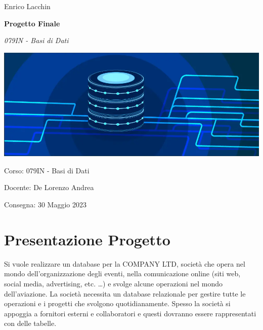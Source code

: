 \documentclass[12pt,a4paper]{article}
\begin{document}

\small{Enrico Lacchin}

\MidSep
\textbf{\LARGE{Progetto Finale}}

\MidSep
\textit{\Large{079IN - Basi di Dati}}
\Sep

\begin{center}
\includegraphics[width=1\columnwidth]{../../img/db}
\end{center}

\vfill
Corso: 079IN - Basi di Dati

Docente: De Lorenzo Andrea

Consegna: 30 Maggio 2023


\clearpage
{}
\setcounter{page}{1}
\tableofcontents

\clearpage

\setcounter{page}{1}

\section{Presentazione Progetto}\label{sec:presentazione-progetto}
Si vuole realizzare un database per la COMPANY LTD, società che opera nel mondo dell’organizzazione degli eventi, nella comunicazione online (siti web, social media, advertising, etc. \dots ) e svolge alcune operazioni nel mondo dell’aviazione. La società necessita un database relazionale per gestire tutte le operazioni e i progetti che svolgono quotidianamente. Spesso la società si appoggia a fornitori esterni e collaboratori e questi dovranno essere rappresentati con delle tabelle.
\end{document}
